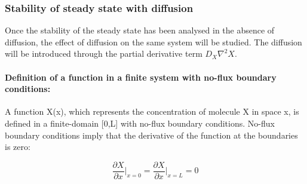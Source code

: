 %
%
%
%
%
%
%
%
%


\subsubsection{Stability of steady state with diffusion}
Once the stability of the steady state has been analysed in the absence of diffusion, the effect of diffusion on the same system will be studied.
The diffusion will be introduced through the partial derivative term $D_{X}\nabla^2 X$.




\paragraph{Definition of a function in a finite system with no-flux boundary conditions:}
A function X(x), which represents the concentration of molecule X in space x, is defined in a finite-domain [0,L] with no-flux boundary conditions.
No-flux boundary conditions imply that the derivative of the function at the boundaries is zero:

\begin{equation}
    \frac{\partial X}{\partial x}\Bigg|_{x=0} = \frac{\partial X}{\partial x}\Bigg|_{x=L} = 0
\end{equation}


